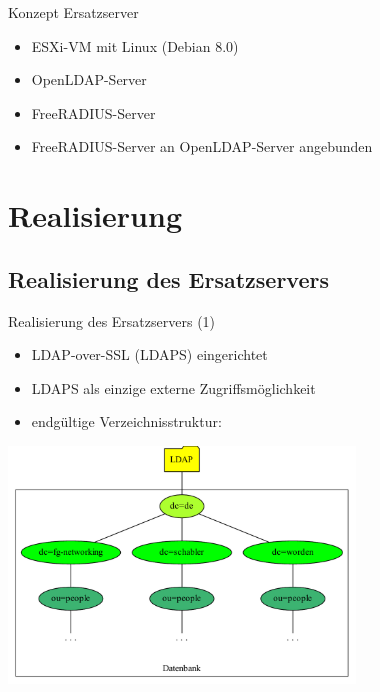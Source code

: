 \documentclass[presentation,svgnames,12pt]{beamer}
\begin{document}
\begin{frame}{Konzept Ersatzserver}
\begin{itemize}
	\item ESXi-VM mit Linux (Debian 8.0)
	\item OpenLDAP-Server%
	\item FreeRADIUS-Server%
	\item FreeRADIUS-Server an OpenLDAP-Server angebunden%
\end{itemize}
\end{frame}


\section{Realisierung}
\subsection{Realisierung des Ersatzservers}
\begin{frame}{Realisierung des Ersatzservers (1)}
\begin{itemize}
	\item LDAP-over-SSL (LDAPS) eingerichtet %
	\item LDAPS als einzige externe Zugriffsmöglichkeit
	\item endgültige Verzeichnisstruktur: %
\end{itemize}
\centering
\includegraphics[width=0.69\textwidth]{Bilder/LDAP-fgn.pdf}
\end{frame}
\end{document}
